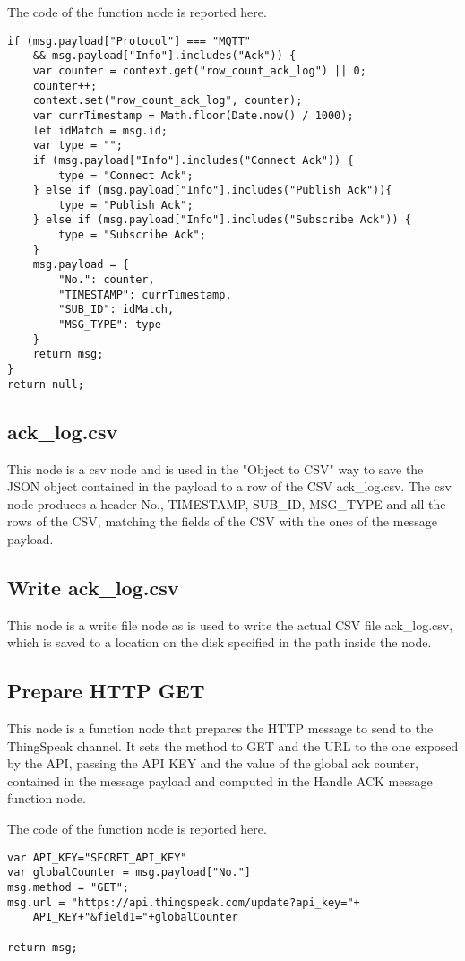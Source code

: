 The code of the function node is reported here.
\begin{verbatim}
if (msg.payload["Protocol"] === "MQTT" 
	&& msg.payload["Info"].includes("Ack")) {
    var counter = context.get("row_count_ack_log") || 0;
    counter++;
    context.set("row_count_ack_log", counter);
    var currTimestamp = Math.floor(Date.now() / 1000);
    let idMatch = msg.id;
    var type = "";
    if (msg.payload["Info"].includes("Connect Ack")) {
        type = "Connect Ack";
    } else if (msg.payload["Info"].includes("Publish Ack")){
        type = "Publish Ack";
    } else if (msg.payload["Info"].includes("Subscribe Ack")) {
        type = "Subscribe Ack";
    }
    msg.payload = {
        "No.": counter,
        "TIMESTAMP": currTimestamp,
        "SUB_ID": idMatch,
        "MSG_TYPE": type
    }
    return msg;
}
return null;
\end{verbatim}

\subsection{ack\_log.csv}
This node is a csv node and is used in the "Object to CSV" way to save the JSON object contained in the payload to a row of the CSV ack\_log.csv. The csv node produces a header No., TIMESTAMP, SUB\_ID, MSG\_TYPE and all the rows of the CSV, matching the fields of the CSV with the ones of the message payload.

\subsection{Write ack\_log.csv}
This node is a write file node as is used to write the actual CSV file ack\_log.csv, which is saved to a location on the disk specified in the path inside the node.

\subsection{Prepare HTTP GET}
This node is a function node that prepares the HTTP message to send to the ThingSpeak channel. It sets the method to GET and the URL to the one exposed by the API, passing the API KEY and the value of the global ack counter, contained in the message payload and computed in the Handle ACK message function node.

The code of the function node is reported here.
\begin{verbatim}
var API_KEY="SECRET_API_KEY"
var globalCounter = msg.payload["No."]
msg.method = "GET";
msg.url = "https://api.thingspeak.com/update?api_key="+
	API_KEY+"&field1="+globalCounter

return msg;
\end{verbatim}

